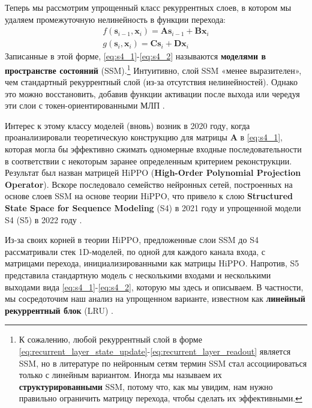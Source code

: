 Теперь мы рассмотрим упрощенный класс рекуррентных слоев, в котором мы удаляем промежуточную нелинейность в функции перехода:
%
\begin{align}
f(\mathbf{s}_{i-1},\mathbf{x}_i)= \mathbf{A}\mathbf{s}_{i-1}+\mathbf{B}\mathbf{x}_i \label{eq:s4_1} \\
g(\mathbf{s}_i,\mathbf{x}_i)=\mathbf{C}\mathbf{s}_i+\mathbf{D}\mathbf{x}_i \label{eq:s4_2}
\end{align}
%
Записанные в этой форме, \eqref{eq:s4_1}-\eqref{eq:s4_2} называются \textbf{моделями в пространстве состояний} (SSM).\footnote{К сожалению, любой рекуррентный слой в форме \eqref{eq:recurrent_layer_state_update}-\eqref{eq:recurrent_layer_readout} является SSM, но в литературе по нейронным сетям термин SSM стал ассоциироваться только с линейным вариантом. Иногда мы называем их \textbf{структурированными} SSM, потому что, как мы увидим, нам нужно правильно ограничить матрицу перехода, чтобы сделать их эффективными.}  Интуитивно, слой SSM «менее выразителен», чем стандартный рекуррентный слой (из-за отсутствия нелинейностей). Однако это можно восстановить, добавив функции активации после выхода или чередуя эти слои с токен-ориентированными МЛП \cite{orvieto2023universality}.

Интерес к этому классу моделей (вновь) возник в 2020 году, когда \cite{gu2020hippo} проанализировали теоретическую конструкцию для матрицы $\mathbf{A}$ в \eqref{eq:s4_1}, которая могла бы эффективно сжимать одномерные входные последовательности в соответствии с некоторым заранее определенным критерием реконструкции. Результат был назван матрицей HiPPO (\textbf{High-Order Polynomial Projection Operator}). Вскоре последовало семейство нейронных сетей, построенных на основе слоев SSM на основе теории HiPPO, что привело к слою \textbf{Structured State Space for Sequence Modeling} (S4) в 2021 году \cite{gu2021efficiently} и упрощенной модели S4 (S5) в 2022 году \cite{smith2022simplified}. 

Из-за своих корней в теории HiPPO, предложенные слои SSM до S4 рассматривали стек 1D-моделей, по одной для каждого канала входа, с матрицами перехода, инициализированными как матрицы HiPPO. Напротив, S5 представила стандартную модель с несколькими входами и несколькими выходами вида \eqref{eq:s4_1}-\eqref{eq:s4_2}, которую мы здесь и описываем. В частности, мы сосредоточим наш анализ на упрощенном варианте, известном как \textbf{линейный рекуррентный блок} (LRU) \cite{orvieto2023resurrecting}.

